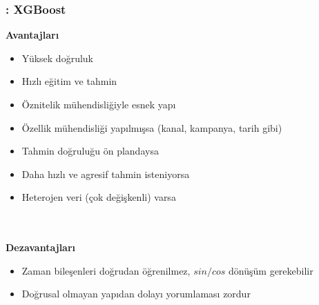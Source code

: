 \documentclass[12pt]{beamer}
\begin{document}
	\begin{frame}
		\frametitle{\insertsection: XGBoost}
		\textbf{Avantajları}
		\begin{itemize}
			\item Yüksek doğruluk
			\item Hızlı eğitim ve tahmin
			\item Öznitelik mühendisliğiyle esnek yapı
			\item Özellik mühendisliği yapılmışsa (kanal, kampanya, tarih
			gibi)
			\item Tahmin doğruluğu ön plandaysa
			\item Daha hızlı ve agresif tahmin isteniyorsa
			\item Heterojen veri (çok değişkenli) varsa
		\end{itemize} \\~\\
		
		\textbf{Dezavantajları}
		\begin{itemize}
			\item Zaman bileşenleri doğrudan öğrenilmez, $sin/cos$ dönüşüm
			gerekebilir
			\item Doğrusal olmayan yapıdan dolayı yorumlaması zordur
		\end{itemize}
	\end{frame}
	
\end{document}
